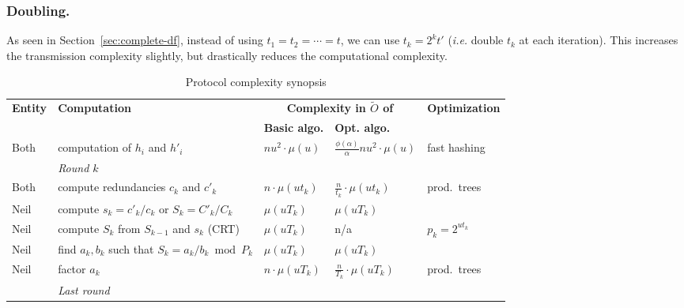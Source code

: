 \documentclass[twoside,envcountsame,runningheads]{llncs}
\newcommand{\Oapp}{\ensuremath{\tilde{O}}}
\newcommand{\ie}{\textit{i.e.}\xspace}
\begin{document}
\subsubsection{Doubling.}
\label{sec:doubling}

As seen in Section~\ref{sec:complete-df}, instead of using $t_1 = t_2 = \cdots = t$, we can use $t_k = 2^k t'$ (\ie double $t_k$ at each iteration).
This increases the transmission complexity slightly, but drastically reduces the computational complexity.

\begin{table}[t]
  \centering
  \caption{Protocol complexity synopsis}
  \label{tab:workload}
 \scriptsize
 \begin{threeparttable}
  \begin{tabularx}{\textwidth}{lXC{2.3cm}C{2.5cm}l}
\toprule
{\bf \hfill Entity \hfill \null} & {\bf \hfill Computation \hfill \null} &  \multicolumn{2}{c}{{\bf Complexity in $\Oapp$ of}} & {\bf \hfill Optimization \hfill \null} \\
\cmidrule(lr){3-4}
& & {\bf Basic algo.} & {\bf Opt. algo.} \\
\midrule
Both  & computation of $h_i$ and $h'_i$ 
      & $n u^2 \cdot \mu(u)$ 
      & $\frac{\phi(\alpha)}{\alpha} n u^2 \cdot \mu(u)$
      & fast hashing%
 \\
\midrule
      & \textit{Round $k$} &  &  \\
Both  & compute redundancies $c_k$ and $c'_k$ 
      & $n \cdot \mu(ut_k)$ 
      & $\frac{n}{t_k} \cdot \mu(ut_k)$
      & prod.\ trees%
 \\
Neil  & compute ${s_k = c'_k/c_k}$ or ${S_k = C'_k / C_k}$
      & $\mu(uT_k)$
      & $\mu(uT_k)$
      &   \\
Neil  & compute $S_k$ from $S_{k-1}$ and $s_k$ (CRT)
      & $\mu(u T_k)$ 
      & n/a
      & $p_k = 2^{ut_k}$%
 \\
Neil  & find $a_k,b_k$ such that ${S_k = a_k/b_k \bmod P_k}$
      & $\mu(u T_k)$
      & $\mu(u T_k)$
      & \\
Neil  & factor $a_k$
      & $n \cdot \mu(uT_k)$ 
      & $\frac{n}{T_k} \cdot \mu(uT_k)$
      & prod.\ trees %
 \\
\midrule
      & \textit{Last round} \\

\end{tabularx}
\end{threeparttable}
\end{table}
\end{document}
